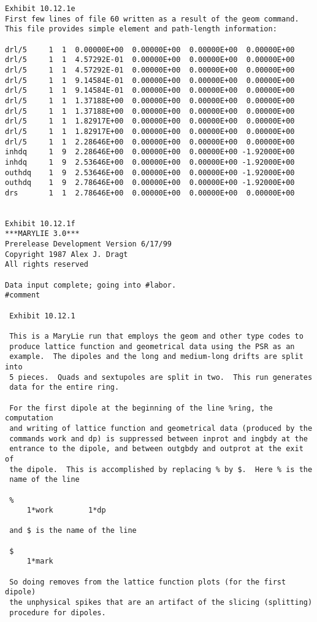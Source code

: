 \begin{footnotesize}
\begin{verbatim}
Exhibit 10.12.1e
First few lines of file 60 written as a result of the geom command.
This file provides simple element and path-length information:

drl/5     1  1  0.00000E+00  0.00000E+00  0.00000E+00  0.00000E+00
drl/5     1  1  4.57292E-01  0.00000E+00  0.00000E+00  0.00000E+00
drl/5     1  1  4.57292E-01  0.00000E+00  0.00000E+00  0.00000E+00
drl/5     1  1  9.14584E-01  0.00000E+00  0.00000E+00  0.00000E+00
drl/5     1  1  9.14584E-01  0.00000E+00  0.00000E+00  0.00000E+00
drl/5     1  1  1.37188E+00  0.00000E+00  0.00000E+00  0.00000E+00
drl/5     1  1  1.37188E+00  0.00000E+00  0.00000E+00  0.00000E+00
drl/5     1  1  1.82917E+00  0.00000E+00  0.00000E+00  0.00000E+00
drl/5     1  1  1.82917E+00  0.00000E+00  0.00000E+00  0.00000E+00
drl/5     1  1  2.28646E+00  0.00000E+00  0.00000E+00  0.00000E+00
inhdq     1  9  2.28646E+00  0.00000E+00  0.00000E+00 -1.92000E+00
inhdq     1  9  2.53646E+00  0.00000E+00  0.00000E+00 -1.92000E+00
outhdq    1  9  2.53646E+00  0.00000E+00  0.00000E+00 -1.92000E+00
outhdq    1  9  2.78646E+00  0.00000E+00  0.00000E+00 -1.92000E+00
drs       1  1  2.78646E+00  0.00000E+00  0.00000E+00  0.00000E+00


Exhibit 10.12.1f
***MARYLIE 3.0***
Prerelease Development Version 6/17/99
Copyright 1987 Alex J. Dragt
All rights reserved

Data input complete; going into #labor.
#comment

 Exhibit 10.12.1

 This is a MaryLie run that employs the geom and other type codes to
 produce lattice function and geometrical data using the PSR as an
 example.  The dipoles and the long and medium-long drifts are split into
 5 pieces.  Quads and sextupoles are split in two.  This run generates
 data for the entire ring.

 For the first dipole at the beginning of the line %ring, the computation
 and writing of lattice function and geometrical data (produced by the
 commands work and dp) is suppressed between inprot and ingbdy at the
 entrance to the dipole, and between outgbdy and outprot at the exit of
 the dipole.  This is accomplished by replacing % by $.  Here % is the
 name of the line

 %
     1*work        1*dp

 and $ is the name of the line

 $
     1*mark

 So doing removes from the lattice function plots (for the first dipole)
 the unphysical spikes that are an artifact of the slicing (splitting)
 procedure for dipoles.


\end{verbatim}
\end{footnotesize}
